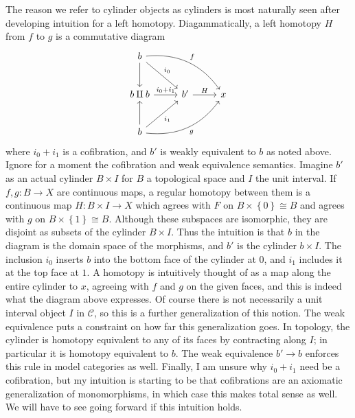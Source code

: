 \begin{intuition}\label{1.2.9}
	The reason we refer to cylinder objects as cylinders is most naturally seen after developing intuition for a left homotopy. Diagammatically, a left homotopy $H$ from $f$ to $g$ is a commutative diagram
	\[\begin{tikzcd}[row sep = 2.5em, column sep = 2.5em]
	b \ar[" i_0 ", dr] \ar[" f ", bend left, drr] \ar[d]  &  &  \\
	b\amalg b \ar[" i_0+i_1 ", r]  & b' \ar[" H ", r]  & x \\
	b \ar[" i_1 "', ur] \ar[" g "', bend right, urr] \ar[u]  &  & 
	\end{tikzcd}\]
	where $i_0+i_1$ is a cofibration, and $b'$ is weakly equivalent to $b$ as noted above. Ignore for a moment the cofibration and weak equivalence semantics. Imagine $b'$ as an actual cylinder $B\times I$ for $B$ a topological space and $I$ the unit interval. If $f,g : B \to X$ are continuous maps, a regular homotopy between them is a continuous map $H : B\times I \to X$ which agrees with $F$ on $B\times \left\{ 0 \right\} \cong B$ and agrees with $g$ on $B\times \left\{ 1 \right\} \cong B$. Although these subspaces are isomorphic, they are disjoint as subsets of the cylinder $B\times I$. Thus the intuition is that $b$ in the diagram is the domain space of the morphisms, and $b'$ is the cylinder $b\times I$. The inclusion $i_0$ inserts $b$ into the bottom face of the cylinder at $0$, and $i_1$ includes it at the top face at $1$. A homotopy is intuitively thought of as a map along the entire cylinder to $x$, agreeing with $f$ and $g$ on the given faces, and this is indeed what the diagram above expresses. Of course there is not necessarily a unit interval object $I$ in $\mathcal{C} $, so this is a further generalization of this notion. The weak equivalence puts a constraint on how far this generalization goes. In topology, the cylinder is homotopy equivalent to any of its faces by contracting along $I$; in particular it is homotopy equivalent to $b$. The weak equivalence $b'\to b$ enforces this rule in model categories as well. Finally, I am unsure why $i_0+i_1$ need be a cofibration, but my intuition is starting to be that cofibrations are an axiomatic generalization of monomorphisms, in which case this makes total sense as well. We will have to see going forward if this intuition holds.


\end{intuition}
